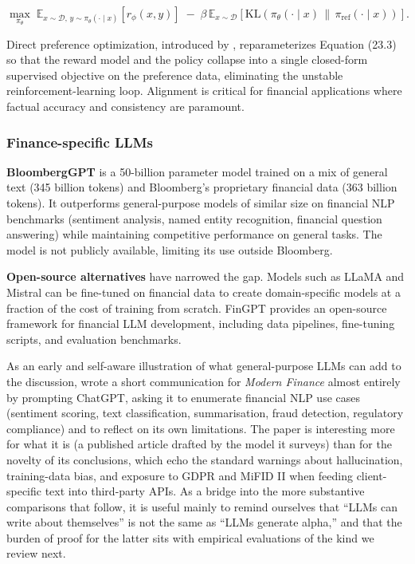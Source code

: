 \begin{equation}
\max_{\pi_\theta}\;\mathbb{E}_{x \sim \mathcal{D},\, y \sim \pi_\theta(\cdot \mid x)}\!\left[r_\phi(x, y)\right] \;-\; \beta\, \mathbb{E}_{x \sim \mathcal{D}}\!\left[\text{KL}(\pi_\theta(\cdot \mid x)\,\|\, \pi_{\text{ref}}(\cdot \mid x))\right].
\tag{23.3}
\end{equation}

Direct preference optimization, introduced by \cite{rafailov2023direct}, reparameterizes Equation (23.3) so that the reward model and the policy collapse into a single closed-form supervised objective on the preference data, eliminating the unstable reinforcement-learning loop. Alignment is critical for financial applications where factual accuracy and consistency are paramount.

\subsubsection{Finance-specific LLMs}

\textbf{BloombergGPT} \citep{wu2023bloomberggpt} is a 50-billion parameter model trained on a mix of general text (345 billion tokens) and Bloomberg's proprietary financial data (363 billion tokens). It outperforms general-purpose models of similar size on financial NLP benchmarks (sentiment analysis, named entity recognition, financial question answering) while maintaining competitive performance on general tasks. The model is not publicly available, limiting its use outside Bloomberg.

\textbf{Open-source alternatives} have narrowed the gap. Models such as LLaMA \citep{touvron2023llama} and Mistral \citep{jiang2023mistral} can be fine-tuned on financial data to create domain-specific models at a fraction of the cost of training from scratch. FinGPT \citep{yang2023fingpt} provides an open-source framework for financial LLM development, including data pipelines, fine-tuning scripts, and evaluation benchmarks.

As an early and self-aware illustration of what general-purpose LLMs can add to the discussion, \cite{zaremba2023chatgpt} wrote a short communication for \textit{Modern Finance} almost entirely by prompting ChatGPT, asking it to enumerate financial NLP use cases (sentiment scoring, text classification, summarisation, fraud detection, regulatory compliance) and to reflect on its own limitations. The paper is interesting more for what it is (a published article drafted by the model it surveys) than for the novelty of its conclusions, which echo the standard warnings about hallucination, training-data bias, and exposure to GDPR and MiFID II when feeding client-specific text into third-party APIs. As a bridge into the more substantive comparisons that follow, it is useful mainly to remind ourselves that ``LLMs can write about themselves'' is not the same as ``LLMs generate alpha,'' and that the burden of proof for the latter sits with empirical evaluations of the kind we review next.

